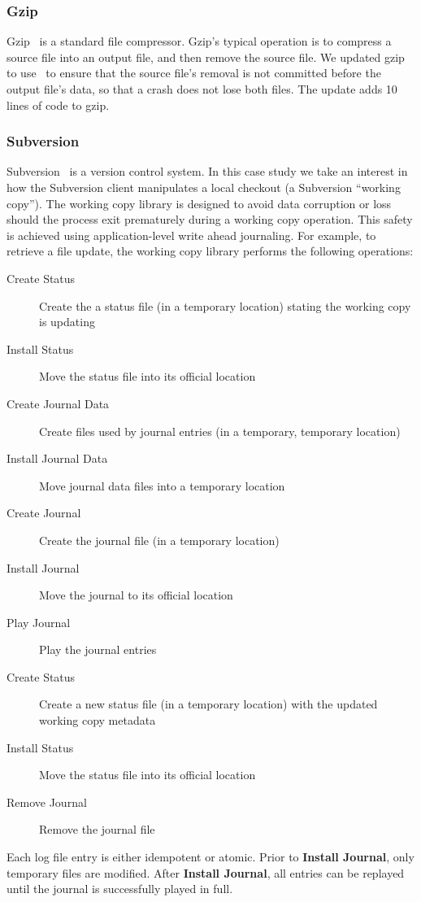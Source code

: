 \subsubsection{Gzip}
\label{sec:opgroup:gzip}

Gzip~\cite{gzip} is a standard file compressor.
%
Gzip's typical operation is to compress a source file into an output file,
and then remove the source file.
%
We updated gzip to use \opgroups\ to ensure that the source file's
removal is not committed before the output file's data, so that a
crash does not lose both files. The update adds 10 lines of code to
gzip.

\subsubsection{Subversion}
\label{sec:opgroup:svn}

Subversion~\cite{svn} is a version control system.
%
In this case study we take an interest in how the Subversion client
manipulates a local checkout (a Subversion ``working copy'').
%
The working copy library is designed to avoid data corruption or loss
should the process exit prematurely during a working copy operation.
%
This safety is achieved using application-level write ahead
journaling.
%
For example, to retrieve a file update, the working copy library
performs the following operations:
%
\begin{description}
\item[Create Status] Create the a status file (in a temporary location)
  stating the working copy is updating
\item[Install Status] Move the status file into its official location
\item[Create Journal Data] Create files used by journal entries (in a
  temporary, temporary location)
\item[Install Journal Data] Move journal data files into a temporary
  location
\item[Create Journal] Create the journal file (in a temporary location)
\item[Install Journal] Move the journal to its official location
\item[Play Journal] Play the journal entries
\item[Create Status] Create a new status file (in a temporary location)
  with the updated working copy metadata
\item[Install Status] Move the status file into its official location
\item[Remove Journal] Remove the journal file
\end{description}
%
Each log file entry is either idempotent or atomic.
%
Prior to \textbf{Install Journal}, only temporary files are modified.
After \textbf{Install Journal}, all entries can be replayed until the
journal is successfully played in full.

